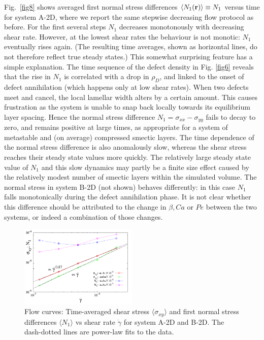 \documentclass[8.5pt,twoside,twocolumn]{article}
\begin{document}
Fig.~\ref{fig8} shows averaged first normal stress differences $\langle N_1({\bf r})\rangle \equiv N_1$ versus time for system A-2D, where we report the same stepwise decreasing flow protocol as before.
For the first several steps $N_1$ decreases monotonously with decreasing shear rate.
However, at the lowest shear rates the behaviour is not monotic: $N_1$ eventually rises again. (The resulting time averages, shown as horizontal lines, do not therefore reflect true steady states.)
This somewhat surprising feature has a simple explanation. 
The time sequence of the defect density in Fig. \ref{fig6} reveals that the rise in $N_1$ is correlated with a drop in $\rho_D$, and linked to the onset of defect annihilation (which happens only at low shear rates).
When two defects meet and cancel, the local lamellar width alters by a certain amount. This causes frustration as the system is unable to snap back locally towards its equilibrium layer spacing. Hence the normal stress difference $N_1=\sigma_{xx}-\sigma_{yy}$ fails to decay to zero, and remains positive at large times, as appropriate for a system of metastable and (on average) compressed smectic layers. The time dependence of the normal stress difference is also anomalously slow, whereas the shear stress reaches their steady state values more quickly. The relatively large steady state value of $N_1$ and this slow dynamics may partly be a finite size effect caused by the relatively modest number of smectic layers within the simulated volume.
The normal stress in system B-2D (not shown) behaves differently: in this case $N_1$ falls monotonically during the defect annihilation phase. 
It is not clear whether this difference should be attributed to the change in $\beta, Ca$ or $Pe$ between the two systems, or indeed a combination of those changes.

\begin{figure}[htp!]
\centering
\includegraphics[angle=0,width=0.5\textwidth]{S_xy_N1_gammadot.pdf}
\caption{Flow curves: Time-averaged shear stress $\langle \sigma_{xy}\rangle$ and first normal stress differences $\langle N_1 \rangle$ vs shear rate $\dot{\gamma}$ for system A-2D and B-2D. The dash-dotted lines are power-law fits to the data.} 
\label{fig9}
\end{figure}
\end{document}
